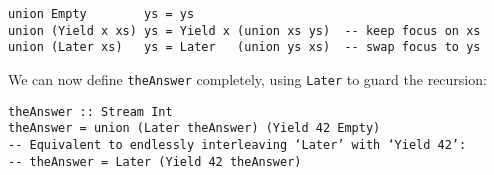 \documentclass[acmsmall,screen,review,anonymous,dvipsnames,svgnames]{acmart}
\newcommand\hask[1]{\texttt{#1}}
\newcommand\ttt\texttt
\begin{document}

\begin{verbatim}
union Empty        ys = ys
union (Yield x xs) ys = Yield x (union xs ys)  -- keep focus on xs
union (Later xs)   ys = Later   (union ys xs)  -- swap focus to ys
\end{verbatim}

\noindent
We can now define \ttt{theAnswer} completely, using \hask{Later} to guard the recursion:

\begin{verbatim}
theAnswer :: Stream Int
theAnswer = union (Later theAnswer) (Yield 42 Empty)
-- Equivalent to endlessly interleaving ‘Later’ with ‘Yield 42’:
-- theAnswer = Later (Yield 42 theAnswer)
\end{verbatim}

\end{document}
